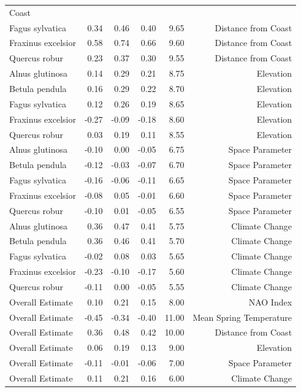 \documentclass{article}\usepackage[]{graphicx}\usepackage[]{color}
\begin{document}
{\begin{table}[H]
\begin{tabular}{lrrrrr}
Coast \\ 
  Fagus sylvatica & 0.34 & 0.46 & 0.40 & 9.65 & Distance from 
Coast \\ 
  Fraxinus excelsior & 0.58 & 0.74 & 0.66 & 9.60 & Distance from 
Coast \\ 
  Quercus robur & 0.23 & 0.37 & 0.30 & 9.55 & Distance from 
Coast \\ 
  Alnus glutinosa & 0.14 & 0.29 & 0.21 & 8.75 & Elevation \\ 
  Betula pendula & 0.16 & 0.29 & 0.22 & 8.70 & Elevation \\ 
  Fagus sylvatica & 0.12 & 0.26 & 0.19 & 8.65 & Elevation \\ 
  Fraxinus excelsior & -0.27 & -0.09 & -0.18 & 8.60 & Elevation \\ 
  Quercus robur & 0.03 & 0.19 & 0.11 & 8.55 & Elevation \\ 
  Alnus glutinosa & -0.10 & 0.00 & -0.05 & 6.75 & Space Parameter \\ 
  Betula pendula & -0.12 & -0.03 & -0.07 & 6.70 & Space Parameter \\ 
  Fagus sylvatica & -0.16 & -0.06 & -0.11 & 6.65 & Space Parameter \\ 
  Fraxinus excelsior & -0.08 & 0.05 & -0.01 & 6.60 & Space Parameter \\ 
  Quercus robur & -0.10 & 0.01 & -0.05 & 6.55 & Space Parameter \\ 
  Alnus glutinosa & 0.36 & 0.47 & 0.41 & 5.75 & Climate Change \\ 
  Betula pendula & 0.36 & 0.46 & 0.41 & 5.70 & Climate Change \\ 
  Fagus sylvatica & -0.02 & 0.08 & 0.03 & 5.65 & Climate Change \\ 
  Fraxinus excelsior & -0.23 & -0.10 & -0.17 & 5.60 & Climate Change \\ 
  Quercus robur & -0.11 & 0.00 & -0.05 & 5.55 & Climate Change \\ 
  Overall Estimate & 0.10 & 0.21 & 0.15 & 8.00 & NAO Index \\ 
  Overall Estimate & -0.45 & -0.34 & -0.40 & 11.00 & Mean Spring 
Temperature \\ 
  Overall Estimate & 0.36 & 0.48 & 0.42 & 10.00 & Distance from 
Coast \\ 
  Overall Estimate & 0.06 & 0.19 & 0.13 & 9.00 & Elevation \\ 
  Overall Estimate & -0.11 & -0.01 & -0.06 & 7.00 & Space Parameter \\ 
  Overall Estimate & 0.11 & 0.21 & 0.16 & 6.00 & Climate Change \\ 

\end{tabular}
\end{table}}
\end{document}
